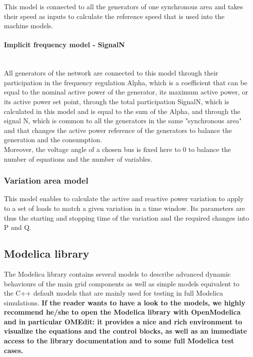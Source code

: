 \documentclass[a4paper, 12pt]{report}
\begin{document}
This model is connected to all the generators of one synchronous area and takes their speed as inputs to calculate the reference speed that is used into the machine models.

\paragraph{Implicit frequency model - SignalN}
~~\\

All generators of the network are connected to this model through their participation in the frequency
regulation Alpha, which is a coefficient that can be equal to the nominal active power of the generator,
its maximum active power, or its active power set point, through the total participation SignalN, which
is calculated in this model and is equal to the sum of the Alpha, and through the signal N, which is common to all the generators in the same "synchronous area" and that changes the active power reference of the generators to balance the generation and the consumption. \\
Moreover, the voltage angle of a chosen bus is fixed here to 0 to balance the number of equations and the number of variables.

\subsubsection{Variation area model}

This model enables to calculate the active and reactive power variation to apply to a set of loads to match a given variation in a time window. Its parameters are thus the starting and stopping time of the variation and the required changes into P and Q.

\subsection{Modelica library}

The \Dynawo Modelica library contains several models to describe advanced dynamic behaviours of the main grid components as well as simple models equivalent to the C++ default models that are mainly used for testing in full Modelica simulations. \textbf{If the reader wants to have a look to the models, we highly recommend he/she to open the \Dynawo Modelica library with OpenModelica and in particular OMEdit: it provides a nice and rich environment to visualize the equations and the control blocks, as well as an immediate access to the library documentation and to some full Modelica test cases. } \\
\end{document}
